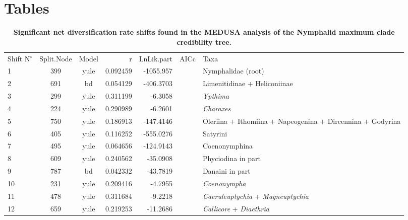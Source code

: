 \documentclass[10pt]{article}
\begin{document}
\section*{Tables}
\begin{table}[!h]
\caption{\bf{Significant net diversification rate shifts found in the MEDUSA analysis of the Nymphalid maximum clade credibility tree.}}
\begin{tabular}{lccrrcl}
Shift N$^\circ$ & Split.Node & Model & r          & LnLik.part & AICc     & Taxa                                                       \\
1               & 399        & yule  & 0.092459   & -1055.957  &          & Nymphalidae (root)                                         \\
2               & 691        & bd    & 0.054129   & -406.3703  &          & Limenitidinae + Heliconiinae                               \\
3               & 299        & yule  & 0.311199   & -6.3058    &          & \emph{Ypthima}                                             \\
4               & 224        & yule  & 0.290989   & -6.2601    &          & \emph{Charaxes}                                            \\
5               & 750        & yule  & 0.186913   & -147.4146  &          & Oleriina + Ithomiina + Napeogenina + Dircennina + Godyrina \\
6               & 405        & yule  & 0.116252   & -555.0276  &          & Satyrini                                                   \\
7               & 495        & yule  & 0.064656   & -124.9143  &          & Coenonymphina                                              \\
8               & 609        & yule  & 0.240562   & -35.0908   &          & Phyciodina in part                                         \\
9               & 787        & bd    & 0.042332   & -43.7819   &          & Danaini in part                                            \\
10              & 231        & yule  & 0.209416   & -4.7955    &          & \emph{Coenonympha}                                         \\
11              & 478        & yule  & 0.311684   & -9.2218    &          & \emph{Caeruleuptychia} + \emph{Magneuptychia}              \\
12              & 659        & yule  & 0.219253   & -11.2686   &          & \emph{Callicore} + \emph{Diaethria}                        \\

\end{tabular}
\end{table}
\end{document}
